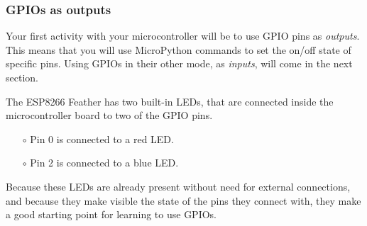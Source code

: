 \subsubsection{GPIOs as outputs}
Your first activity with your microcontroller will be to use GPIO pins as \emph{outputs}. 
This means that you will use MicroPython commands to set the on/off state of specific pins. 
Using GPIOs in their other mode, as \emph{inputs}, will come in the next section.

The ESP8266 Feather has two built-in LEDs, that are connected inside the microcontroller board to two of the GPIO pins. 
\begin{itemize}
	\item[$\circ$] Pin 0 is connected to a red LED. 
	\item[$\circ$] Pin 2 is connected to a blue LED.
\end{itemize}
Because these LEDs are already present without need for external connections, and because they make visible the state of the pins they connect with, they make a good starting point for learning to use GPIOs.

